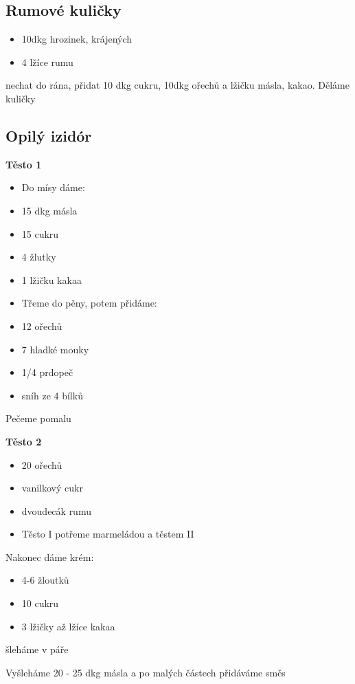 \documentclass[10pt,a4paper]{article}
\newenvironment{myitemize}
{ \begin{itemize}
    \setlength{\itemsep}{0pt}
    \setlength{\parskip}{0pt}
    \setlength{\parsep}{0pt}     }
{ \end{itemize}                  }
\begin{document}
\subsection{Rumové kuličky}
\begin{minipage}[t]{0,5\textwidth}
\begin{myitemize} 
\item 10dkg hrozinek, krájených
\item 4 lžíce rumu
\end{myitemize}
\end{minipage}
\begin{minipage}[t]{0,5\textwidth}
nechat do rána, přidat 10 dkg cukru, 10dkg ořechů a lžičku másla, kakao. Děláme kuličky
\end{minipage}
\subsection{Opilý izidór}
\begin{minipage}[t]{0,5\textwidth}
\textbf{Těsto 1}
\begin{myitemize} 
\item Do mísy dáme:
\item 15 dkg másla 
\item 15 cukru
\item 4 žlutky
\item 1 lžičku kakaa
\item Třeme do pěny,  potem přidáme:
\item 12 ořechů
\item 7 hladké mouky
\item 1/4 prdopeč
\item sníh ze 4 bílků
\end{myitemize}
Pečeme pomalu 
\end{minipage}
\begin{minipage}[t]{0,5\textwidth}
\textbf{Těsto 2}
\begin{myitemize} 
\item 20 ořechů
\item vanilkový cukr
\item dvoudecák rumu
\item Těsto I potřeme marmeládou a těstem II
\end{myitemize}
Nakonec dáme krém:
\begin{myitemize} 
\item 4-6 žloutků 
\item 10 cukru
\item 3 lžičky až lžíce kakaa
\end{myitemize}
šleháme v páře

Vyšleháme 20 - 25 dkg másla a po malých částech přidáváme směs
\end{minipage}
\end{document}
